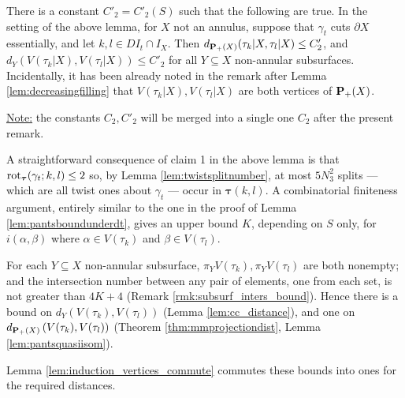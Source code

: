 \begin{rmk}\label{rmk:pantsboundunderdt_cutting}
There is a constant $C'_2=C'_2(S)$ such that the following are true. In the setting of the above lemma, for $X$ not an annulus, suppose that $\gamma_t$ cuts $\partial X$ essentially, and let $k,l\in DI_t\cap I_X$. Then $d_{{\mathbf{P}_+}(X)}(\tau_k|X,\tau_l|X)\leq C'_2$, and\linebreak $d_Y\left(V(\tau_k|X),V(\tau_l|X)\right)\leq C'_2$ for all $Y\subseteq X$ non-annular subsurfaces. Incidentally, it has been already noted in the remark after Lemma \ref{lem:decreasingfilling} that $V(\tau_k|X),V(\tau_l|X)$ are both vertices of ${\mathbf{P}_+}(X)$.

\ul{Note:} the constants $C_2,C'_2$ will be merged into a single one $C_2$ after the present remark.

A straightforward consequence of claim 1 in the above lemma is that $\mathrm{rot}_{\bm\tau}(\gamma_t; k,l)\leq 2$ so, by Lemma \ref{lem:twistsplitnumber}, at most $5N_3^2$ splits --- which are all twist ones about $\gamma_t$ --- occur in $\bm\tau(k,l)$. A combinatorial finiteness argument, entirely similar to the one in the proof of Lemma \ref{lem:pantsboundunderdt}, gives an upper bound $K$, depending on $S$ only, for $i(\alpha,\beta)$ where $\alpha\in V(\tau_k)$ and $\beta\in V(\tau_l)$.

For each $Y\subseteq X$ non-annular subsurface, $\pi_Y V(\tau_k),\pi_Y V(\tau_l)$ are both nonempty; and the intersection number between any pair of elements, one from each set, is not greater than $4K+4$ (Remark \ref{rmk:subsurf_inters_bound}). Hence there is a bound on $d_Y\left(V(\tau_k), V(\tau_l)\right)$ (Lemma \ref{lem:cc_distance}), and one on $d_{{\mathbf{P}_+}(X)}\left(V(\tau_k), V(\tau_l)\right)$ (Theorem \ref{thm:mmprojectiondist}, Lemma \ref{lem:pantsquasiisom}).

Lemma \ref{lem:induction_vertices_commute} commutes these bounds into ones for the required distances.
\end{rmk}

